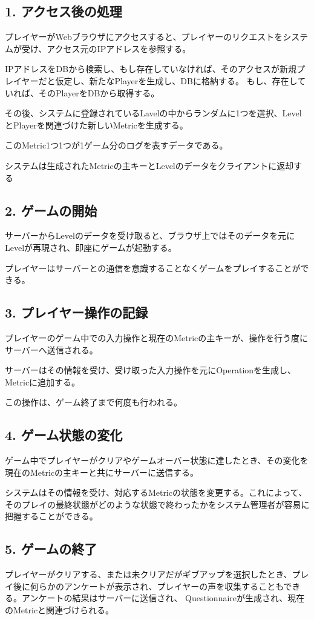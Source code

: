 \subsection{1. アクセス後の処理}
プレイヤーがWebブラウザにアクセスすると、プレイヤーのリクエストをシステムが受け、アクセス元のIPアドレスを参照する。

IPアドレスをDBから検索し、もし存在していなければ、そのアクセスが新規プレイヤーだと仮定し、新たなPlayerを生成し、DBに格納する。
もし、存在していれば、そのPlayerをDBから取得する。

その後、システムに登録されているLavelの中からランダムに1つを選択、LevelとPlayerを関連づけた新しいMetricを生成する。

このMetric1つ1つが1ゲーム分のログを表すデータである。

システムは生成されたMetricの主キーとLevelのデータをクライアントに返却する

\subsection{2. ゲームの開始}
サーバーからLevelのデータを受け取ると、ブラウザ上ではそのデータを元にLevelが再現され、即座にゲームが起動する。

プレイヤーはサーバーとの通信を意識することなくゲームをプレイすることができる。


\subsection{3. プレイヤー操作の記録}
プレイヤーのゲーム中での入力操作と現在のMetricの主キーが、操作を行う度にサーバーへ送信される。

サーバーはその情報を受け、受け取った入力操作を元にOperationを生成し、Metricに追加する。

この操作は、ゲーム終了まで何度も行われる。

\subsection{4. ゲーム状態の変化}
ゲーム中でプレイヤーがクリアやゲームオーバー状態に達したとき、その変化を現在のMetricの主キーと共にサーバーに送信する。

システムはその情報を受け、対応するMetricの状態を変更する。これによって、そのプレイの最終状態がどのような状態で終わったかをシステム管理者が容易に把握することができる。


\subsection{5. ゲームの終了}
プレイヤーがクリアする、または未クリアだがギブアップを選択したとき、プレイ後に何らかのアンケートが表示され、プレイヤーの声を収集することもできる。アンケートの結果はサーバーに送信され、
Questionnaireが生成され、現在のMetricと関連づけられる。


